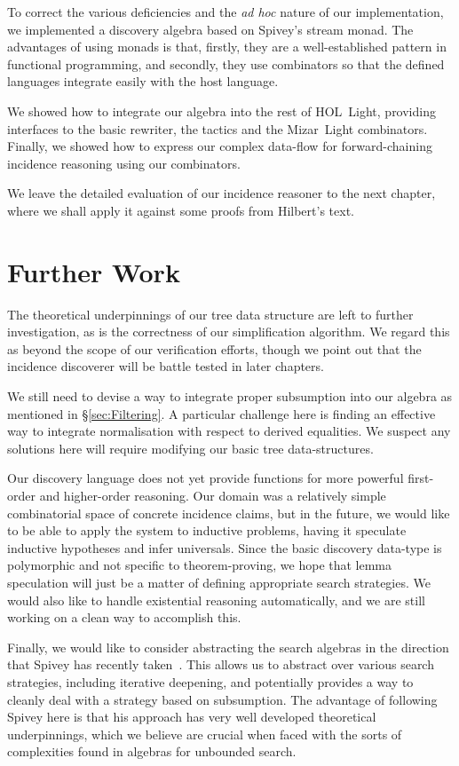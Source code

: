 To correct the various deficiencies and the \emph{ad hoc} nature of our implementation, we implemented a discovery algebra based on Spivey's stream monad. The advantages of using monads is that, firstly, they are a well-established pattern in functional programming, and secondly, they use combinators so that the defined languages integrate easily with the host language.

We showed how to integrate our algebra into the rest of HOL~Light, providing interfaces to the basic rewriter, the tactics and the Mizar~Light combinators. Finally, we showed how to express our complex data-flow for forward-chaining incidence reasoning using our combinators.

We leave the detailed evaluation of our incidence reasoner to the next chapter, where we shall apply it against some proofs from Hilbert's text.

\section{Further Work}
The theoretical underpinnings of our tree data structure are left to further investigation, as is the correctness of our simplification algorithm. We regard this as beyond the scope of our verification efforts, though we point out that the incidence discoverer will be battle tested in later chapters. 

We still need to devise a way to integrate proper subsumption into our algebra as mentioned in \S\ref{sec:Filtering}. A particular challenge here is finding an effective way to integrate normalisation with respect to derived equalities. We suspect any solutions here will require modifying our basic tree data-structures. 

Our discovery language does not yet provide functions for more powerful first-order and higher-order reasoning. Our domain was a relatively simple combinatorial space of concrete incidence claims, but in the future, we would like to be able to apply the system to inductive problems, having it speculate inductive hypotheses and infer universals. Since the basic discovery data-type is polymorphic and not specific to theorem-proving, we hope that lemma speculation will just be a matter of defining appropriate search strategies. We would also like to handle existential reasoning automatically, and we are still working on a clean way to accomplish this. 

Finally, we would like to consider abstracting the search algebras in the direction that Spivey has recently taken~\cite{SearchAlgebras}. This allows us to abstract over various search strategies, including iterative deepening, and potentially provides a way to cleanly deal with a strategy based on subsumption. The advantage of following Spivey here is that his approach has very well developed theoretical underpinnings, which we believe are crucial when faced with the sorts of complexities found in algebras for unbounded search.

